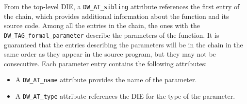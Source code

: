 From the top-level DIE, a \verb|DW_AT_sibling| attribute references the first
entry of the chain, which provides additional information about the function
and its source code. Among all the entries in the chain, the ones with the
\verb|DW_TAG_formal_parameter| describe the parameters of the function. It is
guaranteed that the entries describing the parameters will be in the chain in
the same order as they appear in the source program, but they may not be
consecutive. Each parameter entry contains the following attributes:

\begin{itemize}
  \item A \verb|DW_AT_name| attribute provides the name of the parameter.
  \item A \verb|DW_AT_type| attribute references the DIE for the type of
    the parameter.
\end{itemize}

